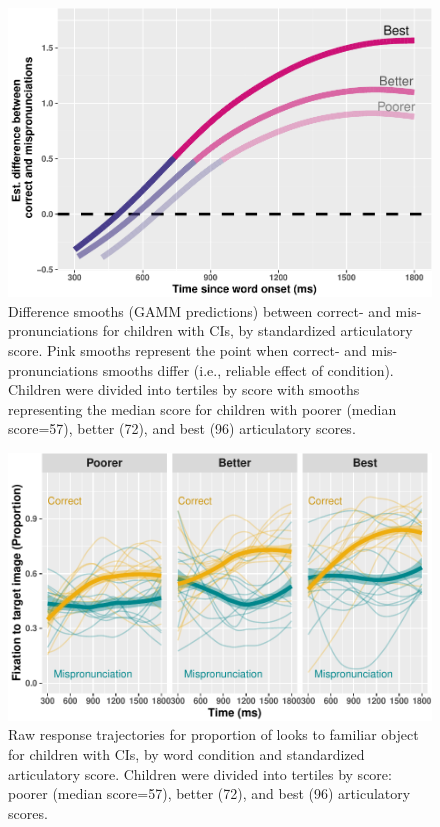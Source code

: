 \documentclass[
]{article}
\begin{document}
\begin{figure}
\centering
\includegraphics{2_modeling_files/figure-latex/CI-diff-plot-1.pdf}
\caption{\label{fig:CI-diff-plot}Difference smooths (GAMM predictions) between correct- and mis-pronunciations for children with CIs, by standardized articulatory score. Pink smooths represent the point when correct- and mis-pronunciations smooths differ (i.e., reliable effect of condition). Children were divided into tertiles by score with smooths representing the median score for children with poorer (median score=57), better (72), and best (96) articulatory scores.}
\end{figure}

\begin{figure}
\centering
\includegraphics{2_modeling_files/figure-latex/CI-raw-plot-1.pdf}
\caption{\label{fig:CI-raw-plot}Raw response trajectories for proportion of looks to familiar object for children with CIs, by word condition and standardized articulatory score. Children were divided into tertiles by score: poorer (median score=57), better (72), and best (96) articulatory scores.}
\end{figure}
\end{document}
